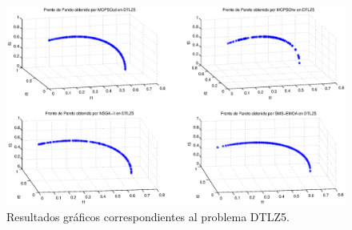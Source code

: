 \DIFaddend \clearpage
\newpage
 \begin{figure}
      \begin{center}
	  \includegraphics[scale=0.45]{Cap4/rdtlz5r.eps}
      \end{center}
	\caption{Resultados gr\'aficos correspondientes al problema DTLZ5.}
      \label{fig:rDTLZ5}
 \end{figure}
\clearpage
 \newpage
